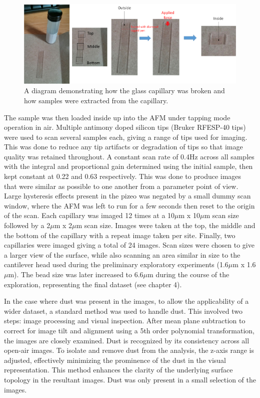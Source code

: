 \begin{figure}[h]     %
        \begin{center}
          \includegraphics[width=120mm]{chapter3/Figure8.png}
\end{center}
\caption{A diagram demonstrating how the glass capillary was broken and how samples were extracted from the capillary.}
\label{fig:figure8}                 %
\end{figure}   


The sample was then loaded inside up into the AFM under tapping mode operation in air. Multiple antimony doped silicon tips (Bruker RFESP-40 tips) were used to scan several samples each, giving a range of tips used for imaging. This was done to reduce any tip artifacts or degradation of tips so that image quality was retained throughout. A constant scan rate of 0.4Hz across all samples with the integral and proportional gain determined using the initial sample, then kept constant at 0.22 and 0.63 respectively. This was done to produce images that were similar as possible to one another from a parameter point of view. Large hysteresis effects present in the pizeo was negated by a small dummy scan window, where the AFM was left to run for a few seconds then reset to the origin of the scan. Each capillary was imaged 12 times at a 10$\mu$m x 10$\mu$m scan size followed by a 2$\mu$m x 2$\mu$m scan size. Images were taken at the top, the middle and the bottom of the capillary with a repeat image taken per site. Finally, two capillaries were imaged giving a total of 24 images. Scan sizes were chosen to give a larger view of the surface, while also scanning an area similar in size to the cantilever head used during the preliminary exploratory experiments (1.6$\mu$m x 1.6$\mu$m). The bead size was later increased to 6.6$\mu$m during the course of the exploration, representing the final dataset (see chapter 4). 

In the case where dust was present in the images, to allow the applicability of a wider dataset, a standard method was used to handle dust. This involved two steps: image processing and visual inspection. After mean plane subtraction to correct for image tilt and alignment using a 5th order polynomial transformation, the images are closely examined. Dust is recognized by its consistency across all open-air images. To isolate and remove dust from the analysis, the z-axis range is adjusted, effectively minimizing the prominence of the dust in the visual representation. This method enhances the clarity of the underlying surface topology in the resultant images. Dust was only present in a small selection of the images.

